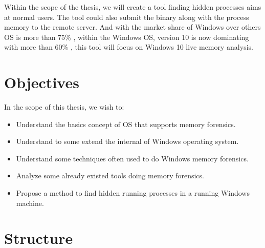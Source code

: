 Within the scope of the thesis, we will create a tool finding hidden processes aims at normal users. The tool could also submit the binary along with the process memory to the remote server. And with the market share of Windows over others OS is more than 75\% \cite{osMarketShare}, within the Windows OS, version 10 is now dominating with more than 60\% \cite{windowsShare}, this tool will focus on Windows 10 live memory analysis.

\section[Objectives]{Objectives}

In the scope of this thesis, we wish to:

\begin{itemize}
  \item Understand the basics concept of OS that supports memory forensics.
  \item Understand to some extend the internal of Windows operating system.
  \item Understand some techniques often used to do Windows memory forensics.
  \item Analyze some already existed tools doing memory forensics.
  \item Propose a method to find hidden running processes in a running Windows machine.
\end{itemize}

\section[Structure]{Structure}

